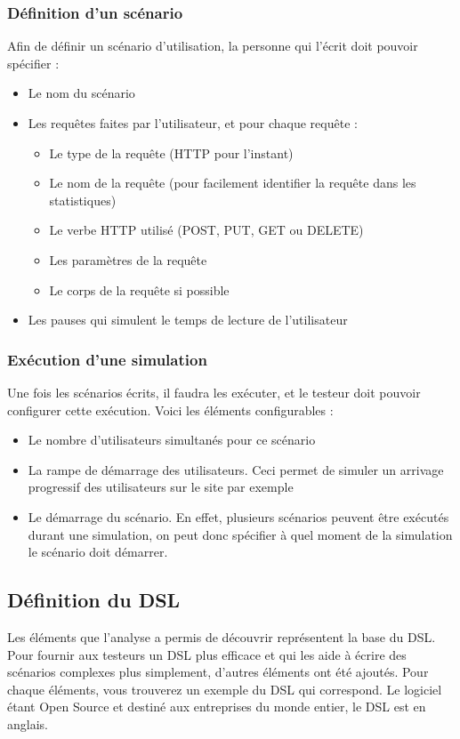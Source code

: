 \subsubsection{Définition d'un scénario}
Afin de définir un scénario d'utilisation, la personne qui l'écrit doit pouvoir spécifier :
\begin{itemize}
  \item Le nom du scénario
  \item Les requêtes faites par l'utilisateur, et pour chaque requête :
  \begin{itemize}
    \item Le type de la requête (HTTP pour l'instant)
	\item Le nom de la requête (pour facilement identifier la requête dans les statistiques)
    \item Le verbe HTTP utilisé (POST, PUT, GET ou DELETE)
    \item Les paramètres de la requête
    \item Le corps de la requête si possible
  \end{itemize}
  \item Les pauses qui simulent le temps de lecture de l'utilisateur
\end{itemize}

\subsubsection{Exécution d'une simulation}
Une fois les scénarios écrits, il faudra les exécuter, et le testeur doit pouvoir configurer cette exécution. Voici les éléments configurables :
\begin{itemize}
  \item Le nombre d'utilisateurs simultanés pour ce scénario
  \item La rampe de démarrage des utilisateurs. Ceci permet de simuler un arrivage progressif des utilisateurs sur le site par exemple
  \item Le démarrage du scénario. En effet, plusieurs scénarios peuvent être exécutés durant une simulation, on peut donc spécifier à quel moment de la simulation le scénario doit démarrer.
\end{itemize}

\subsection{Définition du DSL}
Les éléments que l'analyse a permis de découvrir représentent la base du DSL. Pour fournir aux testeurs un DSL plus efficace et qui les aide à écrire des scénarios complexes plus simplement, d'autres éléments ont été ajoutés. Pour chaque éléments, vous trouverez un exemple du DSL qui correspond. Le logiciel étant Open Source et destiné aux entreprises du monde entier, le DSL est en anglais.



